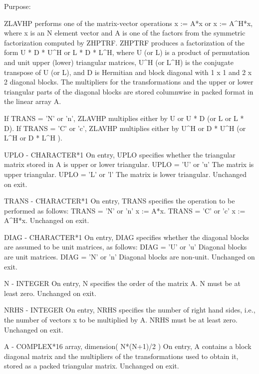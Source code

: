 \begin{DoxyParagraph}{Purpose\+: }
\begin{DoxyVerb}    ZLAVHP  performs one of the matrix-vector operations
       x := A*x  or  x := A^H*x,
    where x is an N element vector and  A is one of the factors
    from the symmetric factorization computed by ZHPTRF.
    ZHPTRF produces a factorization of the form
         U * D * U^H     or     L * D * L^H,
    where U (or L) is a product of permutation and unit upper (lower)
    triangular matrices, U^H (or L^H) is the conjugate transpose of
    U (or L), and D is Hermitian and block diagonal with 1 x 1 and
    2 x 2 diagonal blocks.  The multipliers for the transformations
    and the upper or lower triangular parts of the diagonal blocks
    are stored columnwise in packed format in the linear array A.

    If TRANS = 'N' or 'n', ZLAVHP multiplies either by U or U * D
    (or L or L * D).
    If TRANS = 'C' or 'c', ZLAVHP multiplies either by U^H or D * U^H
    (or L^H or D * L^H ).\end{DoxyVerb}
 \begin{DoxyVerb}  UPLO   - CHARACTER*1
           On entry, UPLO specifies whether the triangular matrix
           stored in A is upper or lower triangular.
              UPLO = 'U' or 'u'   The matrix is upper triangular.
              UPLO = 'L' or 'l'   The matrix is lower triangular.
           Unchanged on exit.

  TRANS  - CHARACTER*1
           On entry, TRANS specifies the operation to be performed as
           follows:
              TRANS = 'N' or 'n'   x := A*x.
              TRANS = 'C' or 'c'   x := A^H*x.
           Unchanged on exit.

  DIAG   - CHARACTER*1
           On entry, DIAG specifies whether the diagonal blocks are
           assumed to be unit matrices, as follows:
              DIAG = 'U' or 'u'   Diagonal blocks are unit matrices.
              DIAG = 'N' or 'n'   Diagonal blocks are non-unit.
           Unchanged on exit.

  N      - INTEGER
           On entry, N specifies the order of the matrix A.
           N must be at least zero.
           Unchanged on exit.

  NRHS   - INTEGER
           On entry, NRHS specifies the number of right hand sides,
           i.e., the number of vectors x to be multiplied by A.
           NRHS must be at least zero.
           Unchanged on exit.

  A      - COMPLEX*16 array, dimension( N*(N+1)/2 )
           On entry, A contains a block diagonal matrix and the
           multipliers of the transformations used to obtain it,
           stored as a packed triangular matrix.
           Unchanged on exit.


\end{DoxyVerb}
\end{DoxyParagraph}
